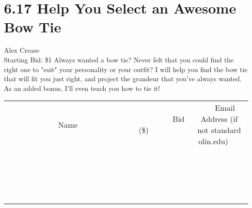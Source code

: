 \documentclass[11pt]{article}
\begin{document}
\section*{6.17 Help You Select an Awesome Bow Tie}
Alex Crease
\\
Starting Bid: \$1
\newline
Always wanted a bow tie? Never felt that you could find the right one to  "suit" your personality or your outfit? I will help you find the bow tie that will fit you just right, and project the grandeur that you've always wanted. As an added bonus, I'll even teach you how to tie it!
\\[3ex]
\begin{tabular}{c c c}
~~~~~~~~~~~~~Name~~~~~~~~~~~~~ & ~~~~~~~~~Bid (\$)~~~~~~~~~  & ~~~Email Address (if not standard olin.edu)~~~\\
 & & \\
\hline
 & & \\
\hline
 & & \\
\hline
 & & \\
\hline
 & & \\
\hline
 & & \\
\hline
 & & \\
\hline
 & & \\
\hline
 & & \\
\hline
 & & \\
\hline
 & & \\
\hline
 & & \\
\hline
 & & \\
\hline
 & & \\
\hline
 & & \\
\hline
 & & \\
\hline
 & & \\
\hline
 & & \\
\hline
 & & \\
\hline
\end{tabular}
\newpage
\end{document}
